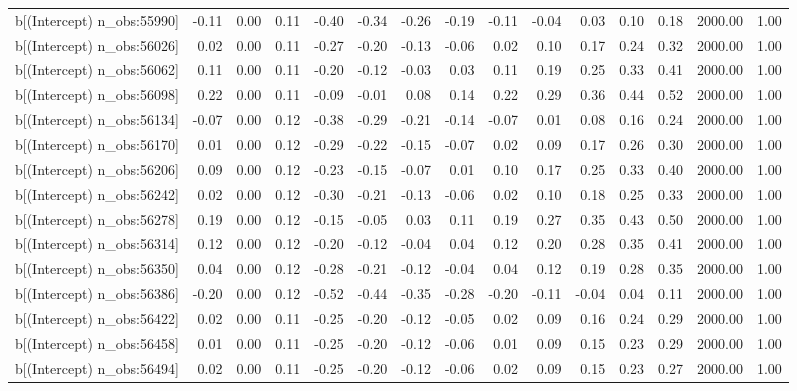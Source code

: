 \begin{table}[ht]
\begin{tabular}{rrrrrrrrrrrrrrr}
  b[(Intercept) n\_obs:55990] & -0.11 & 0.00 & 0.11 & -0.40 & -0.34 & -0.26 & -0.19 & -0.11 & -0.04 & 0.03 & 0.10 & 0.18 & 2000.00 & 1.00 \\ 
  b[(Intercept) n\_obs:56026] & 0.02 & 0.00 & 0.11 & -0.27 & -0.20 & -0.13 & -0.06 & 0.02 & 0.10 & 0.17 & 0.24 & 0.32 & 2000.00 & 1.00 \\ 
  b[(Intercept) n\_obs:56062] & 0.11 & 0.00 & 0.11 & -0.20 & -0.12 & -0.03 & 0.03 & 0.11 & 0.19 & 0.25 & 0.33 & 0.41 & 2000.00 & 1.00 \\ 
  b[(Intercept) n\_obs:56098] & 0.22 & 0.00 & 0.11 & -0.09 & -0.01 & 0.08 & 0.14 & 0.22 & 0.29 & 0.36 & 0.44 & 0.52 & 2000.00 & 1.00 \\ 
  b[(Intercept) n\_obs:56134] & -0.07 & 0.00 & 0.12 & -0.38 & -0.29 & -0.21 & -0.14 & -0.07 & 0.01 & 0.08 & 0.16 & 0.24 & 2000.00 & 1.00 \\ 
  b[(Intercept) n\_obs:56170] & 0.01 & 0.00 & 0.12 & -0.29 & -0.22 & -0.15 & -0.07 & 0.02 & 0.09 & 0.17 & 0.26 & 0.30 & 2000.00 & 1.00 \\ 
  b[(Intercept) n\_obs:56206] & 0.09 & 0.00 & 0.12 & -0.23 & -0.15 & -0.07 & 0.01 & 0.10 & 0.17 & 0.25 & 0.33 & 0.40 & 2000.00 & 1.00 \\ 
  b[(Intercept) n\_obs:56242] & 0.02 & 0.00 & 0.12 & -0.30 & -0.21 & -0.13 & -0.06 & 0.02 & 0.10 & 0.18 & 0.25 & 0.33 & 2000.00 & 1.00 \\ 
  b[(Intercept) n\_obs:56278] & 0.19 & 0.00 & 0.12 & -0.15 & -0.05 & 0.03 & 0.11 & 0.19 & 0.27 & 0.35 & 0.43 & 0.50 & 2000.00 & 1.00 \\ 
  b[(Intercept) n\_obs:56314] & 0.12 & 0.00 & 0.12 & -0.20 & -0.12 & -0.04 & 0.04 & 0.12 & 0.20 & 0.28 & 0.35 & 0.41 & 2000.00 & 1.00 \\ 
  b[(Intercept) n\_obs:56350] & 0.04 & 0.00 & 0.12 & -0.28 & -0.21 & -0.12 & -0.04 & 0.04 & 0.12 & 0.19 & 0.28 & 0.35 & 2000.00 & 1.00 \\ 
  b[(Intercept) n\_obs:56386] & -0.20 & 0.00 & 0.12 & -0.52 & -0.44 & -0.35 & -0.28 & -0.20 & -0.11 & -0.04 & 0.04 & 0.11 & 2000.00 & 1.00 \\ 
  b[(Intercept) n\_obs:56422] & 0.02 & 0.00 & 0.11 & -0.25 & -0.20 & -0.12 & -0.05 & 0.02 & 0.09 & 0.16 & 0.24 & 0.29 & 2000.00 & 1.00 \\ 
  b[(Intercept) n\_obs:56458] & 0.01 & 0.00 & 0.11 & -0.25 & -0.20 & -0.12 & -0.06 & 0.01 & 0.09 & 0.15 & 0.23 & 0.29 & 2000.00 & 1.00 \\ 
  b[(Intercept) n\_obs:56494] & 0.02 & 0.00 & 0.11 & -0.25 & -0.20 & -0.12 & -0.06 & 0.02 & 0.09 & 0.15 & 0.23 & 0.27 & 2000.00 & 1.00 \\ 

\end{tabular}
\end{table}
